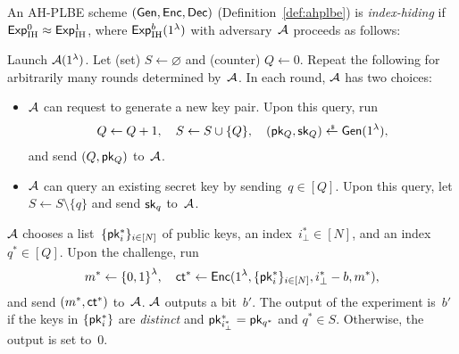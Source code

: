 \begin{definition}\label{def:ahplbe-index-hiding}
An AH-PLBE scheme $({\smash{\mathsf{Gen}}},{\smash{\mathsf{Enc}}},{\smash{\mathsf{Dec}}})$ (Definition~\ref{def:ahplbe})
is \emph{index-hiding} if ${{\smash{\mathsf{Exp}}_{\textup{IH}}^{0}}\approx{\smash{\mathsf{Exp}}_{\textup{IH}}^{1}}}$,
where ${\smash{\mathsf{Exp}}_{\textup{IH}}^{b}}(1^\lambda)$ with adversary~${\mathcal{A}}$ proceeds as follows:
\begin{security}
Launch ${\mathcal{A}}(1^\lambda)$.
Let (set) ${S\gets\varnothing}$ and (counter) ${Q\gets 0}$.
Repeat the following for arbitrarily many rounds determined by~${\mathcal{A}}$.
In each round, ${\mathcal{A}}$ has two choices:
\begin{itemize}
\item ${\mathcal{A}}$ can request to generate a new key pair.
Upon this query, run
\begin{align*}
Q\gets Q+1,\quad
S\gets S\cup\{Q\},\quad
(\pk_Q,\sk_Q)\draws\Gen(1^\lambda),
\end{align*}
and send $(Q,{\smash{\mathsf{pk}}}_Q)$ to~${\mathcal{A}}$.
\item ${\mathcal{A}}$ can query an existing secret key by sending~${q\in[Q]}$.
Upon this query, let
${
S\gets S\setminus\{q\}
}$
and send ${\smash{\mathsf{sk}}}_q$ to~${\mathcal{A}}$.
\end{itemize}
${\mathcal{A}}$ chooses
a list~$\{{\smash{\mathsf{pk}}}_i^\ast\}_{i\in[N]}$ of public keys,
an index~${i_\bot^\ast\in[N]}$, and
an index~${q^\ast\in[Q]}$.
Upon the challenge, run
\begin{align*}
m^\ast\gets\bit^\lambda,\quad
\ct^\ast\gets\Enc(1^\lambda,\{\pk_i^\ast\}_{i\in[N]},i_\bot^\ast-b,m^\ast),
\end{align*}
and send $(m^\ast,{\smash{\mathsf{ct}}}^\ast)$ to~${\mathcal{A}}$.
${\mathcal{A}}$ outputs a bit~$b'$.
The output of the experiment is~$b'$ if
the keys in $\{{\smash{\mathsf{pk}}}_i^\ast\}$ are \emph{distinct} and
${\pk_{i_\bot^\ast}^\ast=\pk_{q^\ast}}$ and ${q^\ast\in S}$.
Otherwise, the output is set to~$0$.
\end{security}
\end{definition}
